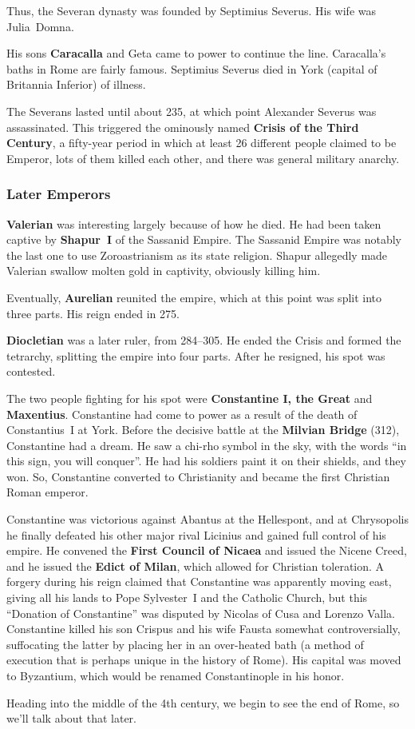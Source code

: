 Thus, the Severan dynasty was founded by Septimius Severus.
His wife was Julia~Domna.

His sons \textbf{Caracalla} and Geta came to power to continue the line.
Caracalla's baths in Rome are fairly famous.
Septimius Severus died in York (capital of Britannia Inferior) of illness.

The Severans lasted until about 235,
at which point Alexander Severus was assassinated.
This triggered the ominously named \textbf{Crisis of the Third Century},
a fifty-year period in which at least 26 different people claimed to be Emperor,
lots of them killed each other, and there was general military anarchy.

\subsubsection*{Later Emperors}

\textbf{Valerian} was interesting largely because of how he died.
He had been taken captive by \textbf{Shapur~I} of the Sassanid Empire.
The Sassanid Empire was notably the last one to use Zoroastrianism as its state religion.
Shapur allegedly made Valerian swallow molten gold in captivity, obviously killing him.

Eventually, \textbf{Aurelian} reunited the empire, which at this point was split into three parts.
His reign ended in 275.

\textbf{Diocletian} was a later ruler, from 284--305.
He ended the Crisis and formed the tetrarchy, splitting the empire into four parts.
After he resigned, his spot was contested.

The two people fighting for his spot were \textbf{Constantine I, the Great} and \textbf{Maxentius}.
Constantine had come to power as a result of the death of Constantius~I at York.
Before the decisive battle at the \textbf{Milvian Bridge} (312), Constantine had a dream.
He saw a chi-rho symbol in the sky, with the words ``in this sign, you will conquer''.
He had his soldiers paint it on their shields, and they won.
So, Constantine converted to Christianity and became the first Christian Roman emperor.

Constantine was victorious against Abantus at the Hellespont,
and at Chrysopolis he finally defeated his other major rival Licinius
and gained full control of his empire.
He convened the \textbf{First Council of Nicaea} and issued the Nicene Creed,
and he issued the \textbf{Edict of Milan}, which allowed for Christian toleration.
A forgery during his reign claimed that Constantine was apparently moving east,
giving all his lands to Pope Sylvester~I and the Catholic Church,
but this ``Donation of Constantine'' was disputed by Nicolas of Cusa and Lorenzo Valla.
Constantine killed his son Crispus and his wife Fausta somewhat controversially,
suffocating the latter by placing her in an over-heated bath
(a method of execution that is perhaps unique in the history of Rome).
His capital was moved to Byzantium, which would be renamed Constantinople in his honor.

Heading into the middle of the 4th century, we begin to see the end of Rome,
so we'll talk about that later.
